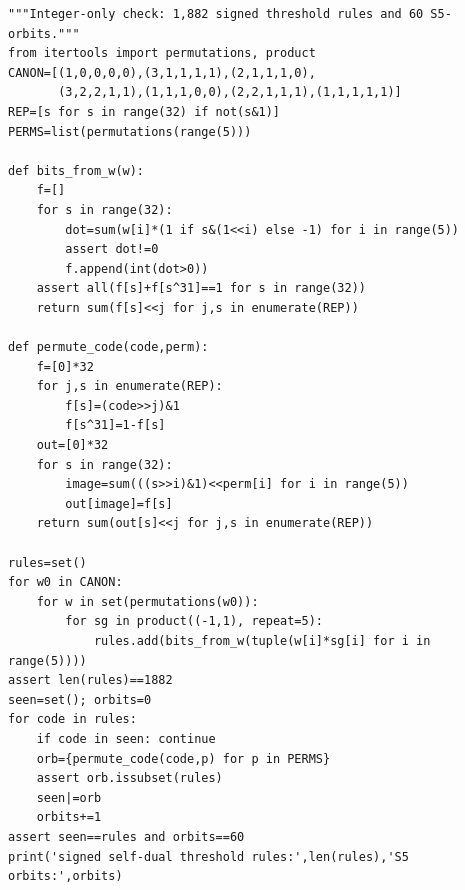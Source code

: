 \documentclass[11pt,a4paper]{ctexart}
\theoremstyle{definition}
\begin{document}
\begin{lstlisting}
"""Integer-only check: 1,882 signed threshold rules and 60 S5-orbits."""
from itertools import permutations, product
CANON=[(1,0,0,0,0),(3,1,1,1,1),(2,1,1,1,0),
       (3,2,2,1,1),(1,1,1,0,0),(2,2,1,1,1),(1,1,1,1,1)]
REP=[s for s in range(32) if not(s&1)]
PERMS=list(permutations(range(5)))

def bits_from_w(w):
    f=[]
    for s in range(32):
        dot=sum(w[i]*(1 if s&(1<<i) else -1) for i in range(5))
        assert dot!=0
        f.append(int(dot>0))
    assert all(f[s]+f[s^31]==1 for s in range(32))
    return sum(f[s]<<j for j,s in enumerate(REP))

def permute_code(code,perm):
    f=[0]*32
    for j,s in enumerate(REP):
        f[s]=(code>>j)&1
        f[s^31]=1-f[s]
    out=[0]*32
    for s in range(32):
        image=sum(((s>>i)&1)<<perm[i] for i in range(5))
        out[image]=f[s]
    return sum(out[s]<<j for j,s in enumerate(REP))

rules=set()
for w0 in CANON:
    for w in set(permutations(w0)):
        for sg in product((-1,1), repeat=5):
            rules.add(bits_from_w(tuple(w[i]*sg[i] for i in range(5))))
assert len(rules)==1882
seen=set(); orbits=0
for code in rules:
    if code in seen: continue
    orb={permute_code(code,p) for p in PERMS}
    assert orb.issubset(rules)
    seen|=orb
    orbits+=1
assert seen==rules and orbits==60
print('signed self-dual threshold rules:',len(rules),'S5 orbits:',orbits)
\end{lstlisting}
\end{document}
